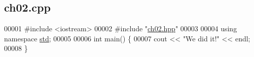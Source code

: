 \hypertarget{ch02_8cpp_source}{}\subsection{ch02.\+cpp}

\begin{DoxyCode}
00001 \textcolor{preprocessor}{#include <iostream>}
00002 \textcolor{preprocessor}{#include "\mbox{\hyperlink{ch02_8hpp}{ch02.hpp}}"}
00003 
00004 \textcolor{keyword}{using namespace }\mbox{\hyperlink{namespacestd}{std}};
00005 
00006 \textcolor{keywordtype}{int} main() \{
00007   cout << \textcolor{stringliteral}{"We did it!"} << endl;
00008 \}
\end{DoxyCode}
